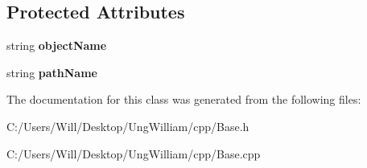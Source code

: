 \subsection*{Protected Attributes}
\begin{DoxyCompactItemize}
\item 
string {\bfseries object\+Name}\hypertarget{class_base_a4493accaea84c12b7d658685cab8e4b4}{}\label{class_base_a4493accaea84c12b7d658685cab8e4b4}

\item 
string {\bfseries path\+Name}\hypertarget{class_base_ae04e87f86b2b19b5feaf62fc2957b0c1}{}\label{class_base_ae04e87f86b2b19b5feaf62fc2957b0c1}

\end{DoxyCompactItemize}


The documentation for this class was generated from the following files\+:\begin{DoxyCompactItemize}
\item 
C\+:/\+Users/\+Will/\+Desktop/\+Ung\+William/cpp/Base.\+h\item 
C\+:/\+Users/\+Will/\+Desktop/\+Ung\+William/cpp/Base.\+cpp\end{DoxyCompactItemize}
